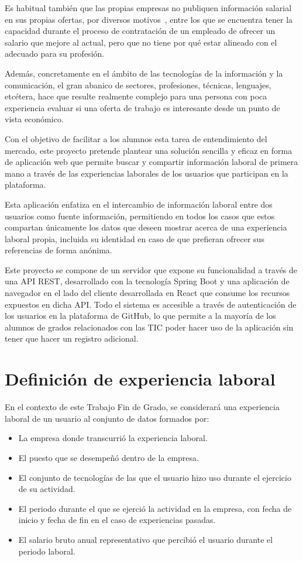 \documentclass[a4paper, 12pt]{book}
\begin{document}
    Es habitual también que las propias empresas no publiquen información salarial en sus propias ofertas, por diversos motivos~\cite{bib:bonilista}, entre los que se encuentra
    tener la capacidad durante el proceso de contratación de un empleado de ofrecer un salario que mejore al actual, pero que no tiene
    por qué estar alineado con el adecuado para su profesión.

    Además, concretamente en el ámbito de las tecnologías de la información y la comunicación, el gran abanico de sectores, profesiones, técnicas, lenguajes, etcétera,
    hace que resulte realmente complejo para una persona con poca experiencia evaluar si una oferta de trabajo es interesante desde un punto de vista económico.

    Con el objetivo de facilitar a los alumnos esta tarea de entendimiento del mercado, este proyecto pretende plantear una solución sencilla y eficaz en forma de aplicación
    web que permite buscar y compartir información laboral de primera mano a través de las experiencias laborales de los usuarios que participan en la plataforma.

    Esta aplicación enfatiza en el intercambio de información laboral entre dos usuarios como fuente información, permitiendo en todos los casos que estos compartan únicamente los datos que deseen mostrar acerca de una experiencia laboral propia,
    incluida su identidad en caso de que prefieran ofrecer sus referencias de forma anónima.

    Este proyecto se compone de un servidor que expone su funcionalidad a través de una API REST, desarrollado con la tecnología Spring Boot y una aplicación de navegador en el lado del cliente desarrollada en React que consume los recursos expuestos en dicha API.
    Todo el sistema es accesible a través de autenticación de los usuarios en la plataforma de GitHub, lo que permite a la mayoría de los alumnos de grados relacionados con las TIC poder hacer uso de la aplicación sin tener que hacer un registro adicional.


    \section{Definición de experiencia laboral}
    \label{sec:intro_workexperiencedefinition}
    En el contexto de este Trabajo Fin de Grado, se considerará una experiencia laboral de un usuario al conjunto de datos formados por:

    \begin{itemize}
        \item La empresa donde transcurrió la experiencia laboral.
        \item El puesto que se desempeñó dentro de la empresa.
        \item El conjunto de tecnologías de las que el usuario hizo uso durante el ejercicio de su actividad.
        \item El periodo durante el que se ejerció la actividad en la empresa, con fecha de inicio y fecha de fin en el caso de experiencias pasadas.
        \item El salario bruto anual representativo que percibió el usuario durante el periodo laboral.
    \end{itemize}
\end{document}
